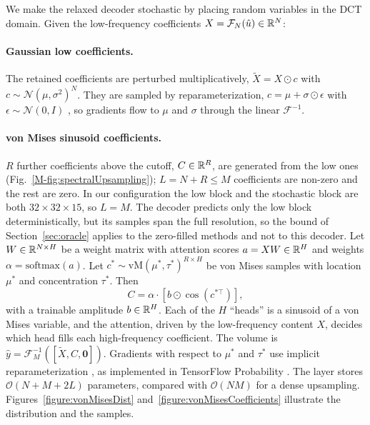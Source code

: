 We make the relaxed decoder stochastic by placing random variables in the DCT domain. Given the low-frequency coefficients $X = \mathcal{F}_N(\hat u)\in\mathbb{R}^N$:

\paragraph{Gaussian low coefficients.} The retained coefficients are perturbed multiplicatively, $\tilde X = X\odot c$ with $c\sim\mathcal{N}(\mu,\sigma^2)^N$. They are sampled by reparameterization, $c = \mu + \sigma\odot\epsilon$ with $\epsilon\sim\mathcal{N}(0,I)$ \citep{kingma2013auto}, so gradients flow to $\mu$ and $\sigma$ through the linear $\mathcal{F}^{-1}$.

\paragraph{von Mises sinusoid coefficients.} $R$ further coefficients above the cutoff, $C\in\mathbb{R}^{R}$, are generated from the low ones (Fig.~\ref{M-fig:spectralUpsampling}); $L=N+R\le M$ coefficients are non-zero and the rest are zero. In our configuration the low block and the stochastic block are both $32\times32\times15$, so $L=M$. The decoder predicts only the low block deterministically, but its samples span the full resolution, so the bound of Section~\ref{sec:oracle} applies to the zero-filled methods and not to this decoder. Let $W\in\mathbb{R}^{N\times H}$ be a weight matrix with attention scores $a = X W\in\mathbb{R}^H$ and weights $\alpha = \mathrm{softmax}(a)$. Let $c^*\sim\mathrm{vM}(\mu^*,\tau^*)^{R\times H}$ be von Mises samples with location $\mu^*$ and concentration $\tau^*$. Then
\begin{equation}\label{eq:sinusoids}
	C = \alpha\cdot\left[b\odot\cos(c^{*\top})\right],
\end{equation}
with a trainable amplitude $b\in\mathbb{R}^H$. Each of the $H$ ``heads'' is a sinusoid of a von Mises variable, and the attention, driven by the low-frequency content $X$, decides which head fills each high-frequency coefficient. The volume is $\hat y = \mathcal{F}^{-1}_M([\tilde X, C, \mathbf{0}])$. Gradients with respect to $\mu^*$ and $\tau^*$ use implicit reparameterization \citep{figurnov2018implicit}, as implemented in TensorFlow Probability \citep{dillon2017tensorflow}. The layer stores $\mathcal{O}(N+M+2L)$ parameters, compared with $\mathcal{O}(NM)$ for a dense upsampling. Figures~\ref{figure:vonMisesDist} and~\ref{figure:vonMisesCoefficients} illustrate the distribution and the samples.


